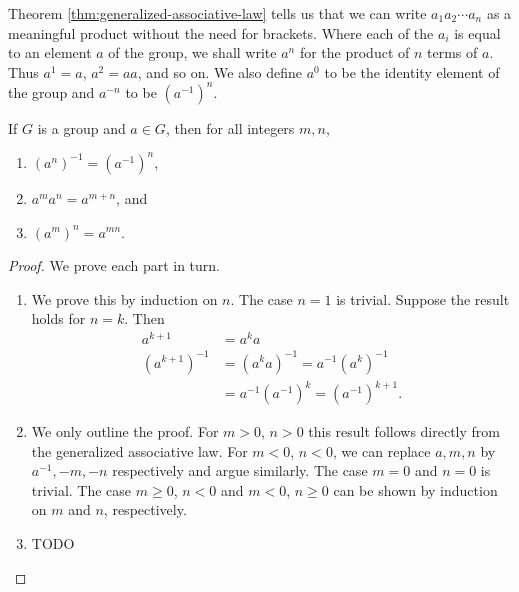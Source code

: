 \begin{remark}
    Theorem \ref{thm:generalized-associative-law} tells us that we can write
    \(a_1 a_2 \cdots a_n\) as a meaningful product without the need for
    brackets. Where each of the \(a_i\) is equal to an element \(a\) of the
    group, we shall write \(a^n\) for the product of \(n\) terms of \(a\). Thus
    \(a^1 = a\), \(a^2 = aa\), and so on. We also define \(a^0\) to be the
    identity element of the group and \(a^{-n}\) to be \((a^{-1})^n\).
\end{remark}

\begin{theorem}
    If \(G\) is a group and \(a \in G\), then for all integers \(m, n\),
    \begin{enumerate}[label=(\alph*)]
        \item \((a^n)^{-1} = (a^{-1})^n\),
        \item \(a^m a^n = a^{m + n}\), and
        \item \((a^m)^n = a^{mn}\).
    \end{enumerate}
\end{theorem}

\begin{proof}
    We prove each part in turn.
    \begin{enumerate}[label=(\alph*), wide]
        \item We prove this by induction on \(n\). The case \(n = 1\) is
        trivial. Suppose the result holds for \(n = k\). Then
        \begin{align*}
            a^{k + 1} & = a^k a\\
            (a^{k + 1})^{-1} & = (a^k a)^{-1} = a^{-1} (a^k)^{-1}\\
            & = a^{-1} (a^{-1})^k = (a^{-1})^{k + 1}.
        \end{align*}
        \item We only outline the proof. For \(m > 0\), \(n > 0\) this result
        follows directly from the generalized associative law. For \(m < 0\),
        \(n < 0\), we can replace \(a, m, n\) by \(a^{-1}, -m, -n\) respectively
        and argue similarly. The case \(m = 0\) and \(n = 0\) is trivial. The
        case \(m \geq 0\), \(n < 0\) and \(m < 0\), \(n \geq 0\) can be shown by
        induction on \(m\) and \(n\), respectively.
        
        \item TODO

    \end{enumerate}
\end{proof}


